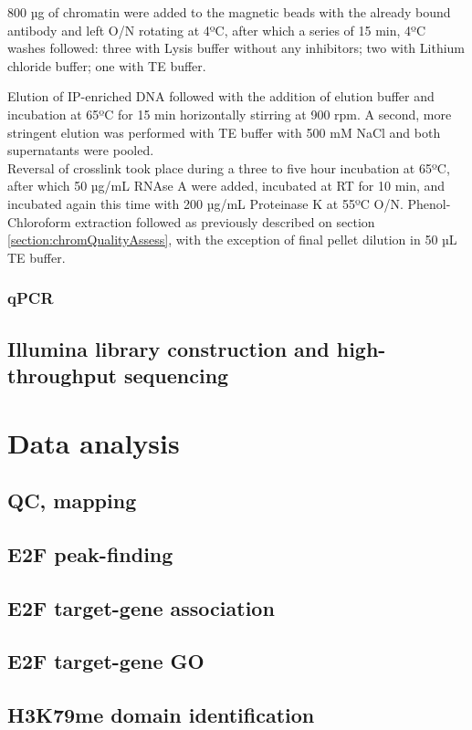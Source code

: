 \documentclass[11pt,twoside,a4paper]{report}
\begin{document}
			800 µg of chromatin were added to the magnetic beads with the already bound antibody and left O/N rotating at 4ºC, after which a series of 15 min, 4ºC washes followed: three with Lysis buffer without any inhibitors; two with Lithium chloride buffer; one with TE buffer.
			
			Elution of IP-enriched DNA followed with the addition of elution buffer and incubation at 65ºC for 15 min horizontally stirring at 900 rpm. A second, more stringent elution was performed with TE buffer with 500 mM NaCl and both supernatants were pooled. \\
			
			Reversal of crosslink took place during a three to five hour incubation at 65ºC, after which 50 µg/mL RNAse A were added, incubated at RT for 10 min, and incubated again this time with 200 µg/mL Proteinase K at 55ºC O/N. Phenol-Chloroform extraction followed as previously described on section \ref{section:chromQualityAssess}, with the exception of final pellet dilution in 50 µL TE buffer.
			\subsubsection{qPCR}
		
		
		\subsection{Illumina library construction and high-throughput sequencing}
		
	\section{Data analysis}
		\subsection{QC, mapping}
		\subsection{E2F peak-finding}
		\subsection{E2F target-gene association}
		\subsection{E2F target-gene GO}
		\subsection{H3K79me domain identification}
\end{document}
